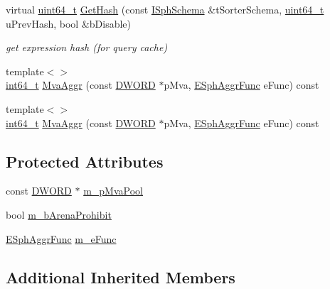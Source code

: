\begin{DoxyCompactItemize}
virtual \hyperlink{sphinxstd_8h_aaa5d1cd013383c889537491c3cfd9aad}{uint64\-\_\-t} \hyperlink{classExpr__MVAAggr__c_acf891900d9c346c14055bae09757d9ba}{Get\-Hash} (const \hyperlink{classISphSchema}{I\-Sph\-Schema} \&t\-Sorter\-Schema, \hyperlink{sphinxstd_8h_aaa5d1cd013383c889537491c3cfd9aad}{uint64\-\_\-t} u\-Prev\-Hash, bool \&b\-Disable)
\begin{DoxyCompactList}\small\item\em get expression hash (for query cache) \end{DoxyCompactList}\item 
{\footnotesize template$<$$>$ }\\\hyperlink{sphinxstd_8h_a996e72f71b11a5bb8b3b7b6936b1516d}{int64\-\_\-t} \hyperlink{classExpr__MVAAggr__c_ac6d44666c2e14a2a7c9926c2975740fa}{Mva\-Aggr} (const \hyperlink{sphinxstd_8h_a798af1e30bc65f319c1a246cecf59e39}{D\-W\-O\-R\-D} $\ast$p\-Mva, \hyperlink{sphinx_8h_a92532037c3ec9dad4a636e957fff58c9}{E\-Sph\-Aggr\-Func} e\-Func) const
\item 
{\footnotesize template$<$$>$ }\\\hyperlink{sphinxstd_8h_a996e72f71b11a5bb8b3b7b6936b1516d}{int64\-\_\-t} \hyperlink{classExpr__MVAAggr__c_ad1f79d111b83a6581173992333d586bc}{Mva\-Aggr} (const \hyperlink{sphinxstd_8h_a798af1e30bc65f319c1a246cecf59e39}{D\-W\-O\-R\-D} $\ast$p\-Mva, \hyperlink{sphinx_8h_a92532037c3ec9dad4a636e957fff58c9}{E\-Sph\-Aggr\-Func} e\-Func) const
\end{DoxyCompactItemize}
\subsection*{Protected Attributes}
\begin{DoxyCompactItemize}
\item 
const \hyperlink{sphinxstd_8h_a798af1e30bc65f319c1a246cecf59e39}{D\-W\-O\-R\-D} $\ast$ \hyperlink{classExpr__MVAAggr__c_a928aea58ba316b1c727583886d6954bc}{m\-\_\-p\-Mva\-Pool}
\item 
bool \hyperlink{classExpr__MVAAggr__c_aa627ac458abf03a80b9a29c004869b23}{m\-\_\-b\-Arena\-Prohibit}
\item 
\hyperlink{sphinx_8h_a92532037c3ec9dad4a636e957fff58c9}{E\-Sph\-Aggr\-Func} \hyperlink{classExpr__MVAAggr__c_a4b1db304df7400f5697429b7cb8fe330}{m\-\_\-e\-Func}
\end{DoxyCompactItemize}
\subsection*{Additional Inherited Members}


